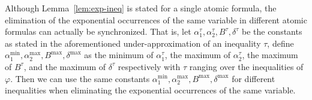 Although Lemma~\ref{lem:exp-ineq} is stated for a single atomic formula, the elimination of the exponential occurrences of the same variable in different atomic formulas can actually be synchronized. That is,  let $\alpha^\tau_{1}, \alpha^\tau_{2}, B^\tau, \delta^\tau$ be the constants as stated in the aforementioned under-approximation of an inequality $\tau$, define $\alpha^{\min}_1, \alpha^{\max}_2, B^{\max}, \delta^{\max}$ as the minimum of $\alpha^\tau_1$, the maximum of $\alpha^\tau_2$, the maximum of $B^\tau$, and the maximum of $\delta^\tau$ respectively with $\tau$ ranging over the inequalities of $\varphi$. Then we can use the same constants $\alpha^{\min}_1, \alpha^{\max}_2, B^{\max}, \delta^{\max}$ for different inequalities when eliminating the exponential occurrences of the same variable. 

